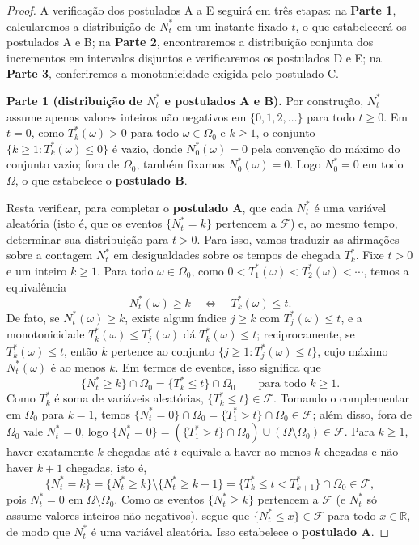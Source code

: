 \documentclass[12pt,portuguese]{article}
\theoremstyle{definition}
\theoremstyle{plainexercise}
\theoremstyle{starredexercise}
\theoremstyle{definition}
\begin{document}
\begin{proof}
A verificação dos postulados A a E seguirá em três etapas: na \textbf{Parte 1},
calcularemos a distribuição de $N_t^*$ em um instante fixado $t$, o que
estabelecerá os postulados A e B; na \textbf{Parte 2}, encontraremos a
distribuição conjunta dos incrementos em intervalos disjuntos e verificaremos os
postulados D e E; na \textbf{Parte 3}, conferiremos a monotonicidade exigida
pelo postulado C.

\bigskip 
\bigskip 

\noindent\textbf{Parte 1 (distribuição de $N_t^*$ e postulados A e B).}
Por construção, $N_t^*$ assume apenas valores inteiros não negativos em
$\{0,1,2,\ldots\}$ para todo $t\geqslant0$. Em $t=0$, como $T_k^*(\omega)>0$
para todo $\omega\in\Omega_0$ e $k\geqslant1$, o conjunto
$\{k\geqslant1:T_k^*(\omega)\leqslant0\}$ é vazio, donde $N_0^*(\omega)=0$ pela
convenção do máximo do conjunto vazio; fora de $\Omega_0$, também fixamos
$N_0^*(\omega)=0$. Logo $N_0^*=0$ em todo $\Omega$, o que estabelece o
\textbf{postulado B}.

Resta verificar, para completar o \textbf{postulado A}, que cada $N_t^*$ é uma
variável aleatória (isto é, que os eventos $\{N_t^*=k\}$ pertencem a $\mathcal{F}$)
e, ao mesmo tempo, determinar sua distribuição para $t>0$. Para isso, vamos
traduzir as afirmações sobre a contagem $N_t^*$ em desigualdades sobre os
tempos de chegada $T_k^*$. Fixe $t>0$ e um inteiro $k\geqslant1$. Para todo
$\omega\in\Omega_0$, como $0<T_1^*(\omega)<T_2^*(\omega)<\cdots$, temos a
equivalência
\[
  N_t^*(\omega)\geqslant k
  \quad\Longleftrightarrow\quad
  T_k^*(\omega)\leqslant t.
\]
De fato, se $N_t^*(\omega)\geqslant k$, existe algum índice $j\geqslant k$ com
$T_j^*(\omega)\leqslant t$, e a monotonicidade $T_k^*(\omega)\leqslant T_j^*(\omega)$
dá $T_k^*(\omega)\leqslant t$; reciprocamente, se $T_k^*(\omega)\leqslant t$,
então $k$ pertence ao conjunto $\{j\geqslant1:T_j^*(\omega)\leqslant t\}$, cujo
máximo $N_t^*(\omega)$ é ao menos $k$. Em termos de eventos, isso significa que
\begin{equation}\label{eq:nt-maior-igual-k}
  \{N_t^*\geqslant k\}\cap\Omega_0 = \{T_k^*\leqslant t\}\cap\Omega_0
  \qquad\text{para todo } k\geqslant1.
\end{equation}
Como $T_k^*$ é soma de variáveis aleatórias, $\{T_k^*\leqslant t\}\in\mathcal{F}$.
Tomando o complementar em $\Omega_0$ para $k=1$, temos
$\{N_t^*=0\}\cap\Omega_0=\{T_1^*>t\}\cap\Omega_0\in\mathcal{F}$; além disso,
fora de $\Omega_0$ vale $N_t^*=0$, logo $\{N_t^*=0\}=(\{T_1^*>t\}\cap\Omega_0)\cup(\Omega\setminus\Omega_0)\in\mathcal{F}$.
Para $k\geqslant1$, haver exatamente $k$ chegadas até $t$ equivale a haver ao
menos $k$ chegadas e não haver $k+1$ chegadas, isto é,
\[
  \{N_t^*=k\}
  =\{N_t^*\geqslant k\}\setminus\{N_t^*\geqslant k+1\}
  =\{T_k^*\leqslant t<T_{k+1}^*\}\cap\Omega_0\in\mathcal{F},
\]
pois $N_t^*=0$ em $\Omega\setminus\Omega_0$. Como os eventos $\{N_t^*\geqslant k\}$
pertencem a $\mathcal{F}$ (e $N_t^*$ só assume valores inteiros não negativos),
segue que $\{N_t^*\leqslant x\}\in\mathcal{F}$ para todo $x\in\mathbb{R}$, de
modo que $N_t^*$ é uma variável aleatória. Isso estabelece o \textbf{postulado A}.


\end{proof}
\end{document}
